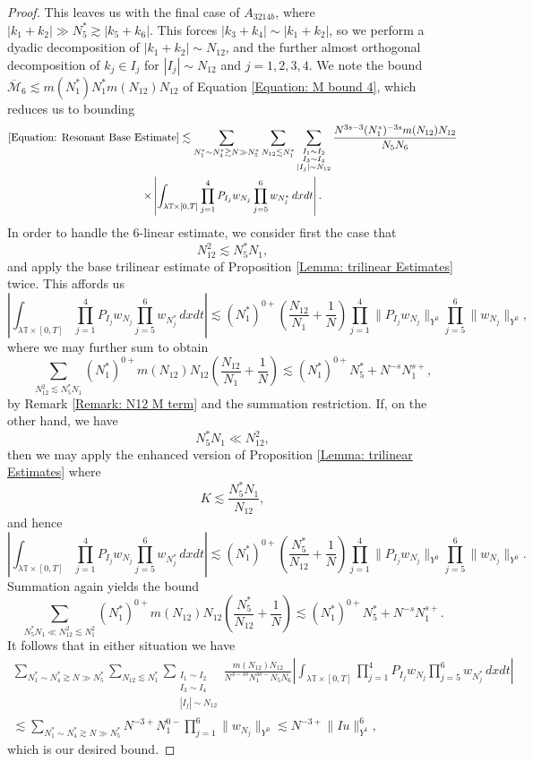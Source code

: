 \documentclass[10pt,a4paper]{amsart}
\begin{document}
\begin{proof}
    This leaves us with the final case of $A_{3214b}$, where $|k_1+k_2|\gg N_5^*\gtrsim |k_5+k_6|$. This forces $|k_3+k_4|\sim |k_1+k_2|$, so we perform a dyadic decomposition of $|k_1+k_2|\sim N_{12}$, and the further almost orthogonal decomposition of $k_j\in I_j$ for $|I_j|\sim N_{12}$ and $j = 1,2,3,4$. We note the bound $\overline{\mathcal{M}}_6\lesssim m(N_1^*)N_1^*m(N_{12})N_{12}$ of Equation \eqref{Equation: M bound 4}, which reduces us to bounding
    \begin{multline*}
        \eqref{Equation: Resonant Base Estimate}\lesssim \sum_{N_1^*\sim N_4^*\gtrsim N\gg N_5^*}\sum_{N_{12}\lesssim N_1^*}\sum_{\substack{I_1\sim I_2\\I_3\sim I_4\\|I_j|\sim N_{12}}}\frac{N^{3s-3}(N_1^*)^{-3s}m(N_{12})N_{12}}{N_5N_6}\\
        \times\left|\int_{\lambda\mathbb{T}\times [0,T]}\prod_{j=1}^4P_{I_j}w_{N_j}\prod_{j=5}^6w_{N_j^*}\,dxdt\right|.
    \end{multline*}
    In order to handle the $6$-linear estimate, we consider first the case that
    \[
    N_{12}^2\lesssim N_5^*N_1,
    \]
     and apply the base trilinear estimate of Proposition \ref{Lemma: trilinear Estimates} twice. This affords us
    \[
    \left|\int_{\lambda\mathbb{T}\times [0,T]}\prod_{j=1}^4P_{I_j}w_{N_j}\prod_{j=5}^6w_{N_j^*}\,dxdt\right|\lesssim (N_1^*)^{0+}\left(\frac{N_{12}}{N_1}+\frac{1}{N}\right)\prod_{j=1}^4\|P_{I_j}w_{N_j}\|_{Y^0}\prod_{j=5}^6\|w_{N_j}\|_{Y^0},
    \]
    where we may further sum to obtain
    \[
    \sum_{N_{12}^2\lesssim N_5^*N_1}(N_1^*)^{0+}m(N_{12})N_{12}\left(\frac{N_{12}}{N_1}+\frac{1}{N}\right)\lesssim (N_1^*)^{0+}N_5^* + N^{-s}N_1^{s+},
    \]
    by Remark \ref{Remark: N12 M term} and the summation restriction. If, on the other hand, we have
    \[
    N_5^*N_1\ll N_{12}^2,
    \]
    then we may apply the enhanced version of Proposition \ref{Lemma: trilinear Estimates} where
    \[
    K\lesssim \frac{N_5^*N_1}{N_{12}},
    \]
    and hence
    \[
    \left|\int_{\lambda\mathbb{T}\times [0,T]}\prod_{j=1}^4P_{I_j}w_{N_j}\prod_{j=5}^6w_{N_j^*}\,dxdt\right|\lesssim (N_1^*)^{0+}\left(\frac{N_5^*}{N_{12}}+\frac{1}{N}\right)\prod_{j=1}^4\|P_{I_j}w_{N_j}\|_{Y^0}\prod_{j=5}^6\|w_{N_j}\|_{Y^0}.
    \]
    Summation again yields the bound
    \[
    \sum_{N_5^*N_1\ll N_{12}^2\lesssim N_1^2}(N_1^*)^{0+}m(N_{12})N_{12}\left(\frac{N_{5}^*}{N_{12}}+\frac{1}{N}\right)\lesssim (N_1^*)^{0+}N_5^* + N^{-s}N_1^{s+}.
    \]
    It follows that in either situation we have
    \begin{multline*}
        \sum_{N_1^*\sim N_4^*\gtrsim N\gg N_5^*}\sum_{N_{12}\lesssim N_1^*}\sum_{\substack{I_1\sim I_2\\I_3\sim I_4\\|I_j|\sim N_{12}}}\frac{m(N_{12})N_{12}}{N^{3-3s}N_1^{3s-}N_5N_6}
        \left|\int_{\lambda\mathbb{T}\times [0,T]}\prod_{j=1}^4P_{I_j}w_{N_j}\prod_{j=5}^6w_{N_j^*}\,dxdt\right|\\
        \lesssim \sum_{N_1^*\sim N_4^*\gtrsim N\gg N_5^*}N^{-3+}N_1^{0-}\prod_{j=1}^6 \|w_{N_j}\|_{Y^0}\lesssim N^{-3+}\|Iu\|_{Y^1}^6,
    \end{multline*}
    which is our desired bound.


\end{proof}
\end{document}
